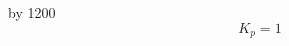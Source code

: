 \documentclass[preview,border={0pt 5pt 0pt 0pt}]{standalone}
\begin{document}
\pdfpxdimen=1in
\divide\pdfpxdimen by 1200
\begin{equation}
K_p = 1
\end{equation}
\end{document}
